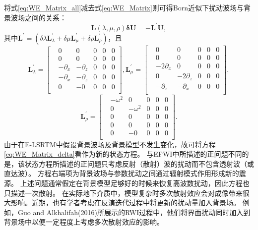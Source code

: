 将式\eqref{eq:WE_Matrix_all}减去式\eqref{eq:WE_Matrix}则可得Born近似下扰动波场与背景波场之间的关系：
\begin{equation}
\mathbf{L}(\lambda,\mu,\rho)\mathbf{\delta U}=-\mathbf{L}^{'}\mathbf{U},
    \label{eq:WE_Matrix_delta} 
\end{equation}
其中$\mathbf{L}^{'}=(\delta\lambda\mathbf{L}^{'}_{\lambda}+\delta\mu\mathbf{L}^{'}_{\mu}+\delta\rho\mathbf{L}^{'}_{\rho})$，且
\begin{equation}
        \mathbf{L}^{'}_{\lambda}=
        \begin{bmatrix}
			&0 &0 &0 & 0 &0\\
			& 0  &0 &0 &0 &0\\
			&-\partial_x &-\partial_z &0 &0&0\\
			& -\partial_x  &-\partial_z &0 &0&0\\
			& 0  &-0&0 &0&0\\
        \end{bmatrix},
        \mathbf{L}^{'}_{\mu}=
        \begin{bmatrix}
            &0 &0 &0 & 0 &0\\
            & 0  &0 &0 &0 &0\\
            &-2\partial_x &0 &0 &0&0\\
            & 0  &-2\partial_z &0 &0&0\\
            & -\partial_z  &-\partial_x&0 &0&0\\
        \end{bmatrix},
        \label{eq:L_lambdamu}
\end{equation}
\begin{equation}
        \mathbf{L}^{'}_{\rho}=
        \begin{bmatrix}
		&-\omega^2 &0 &0 & 0 &0\\
            & 0  &-\omega^2 &0 &0 &0\\
            &0&0 &0 &0&0\\
            &0  &0 &0 &0&0\\
            & 0  &-0&0 &0&0\\
        \end{bmatrix}.
        \label{eq:L_rho}
\end{equation}
由于在E-LSRTM中假设背景波场及背景模型不发生变化，故可将方程\eqref{eq:WE_Matrix_delta}看作为新的状态方程。
与EFWI中所描述的正问题不同的是，该状态方程所描述的正问题只考虑反射（散射）波的扰动而不包含透射波（或直达波）。
方程右端项为背景波场与参数扰动之间通过辐射模式作用形成新的震源。
上述问题通常假定在背景模型足够好的时候来恢复高波数扰动，因此方程也只描述一次散射。
在实际地下介质中，模型复杂时多次散射效应会对成像带来很大影响。近期，也有学者考虑在反演迭代过程中将更新的扰动量加入背景场。
例如，Guo and
Alkhalifah(2016)\cite{Guo2016}所展示的RWI过程中，他们将界面扰动同时加入到背景场中以便一定程度上考虑多次散射效应的影响。
